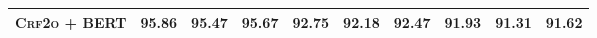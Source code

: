 \begin{table*}[tb!]
\begin{tabularx}{\textwidth}{lccccccccc}
    \textsc{Crf2o} + BERT                            & \textbf{95.86}           & 95.47                      & 95.67                    & \textbf{92.75}           & \textbf{92.18}           & \textbf{92.47}           & \textbf{91.93} & 91.31          & \textbf{91.62} \\
    \bottomrule
  \end{tabularx}
  \label{table:con-test}
\end{table*}

